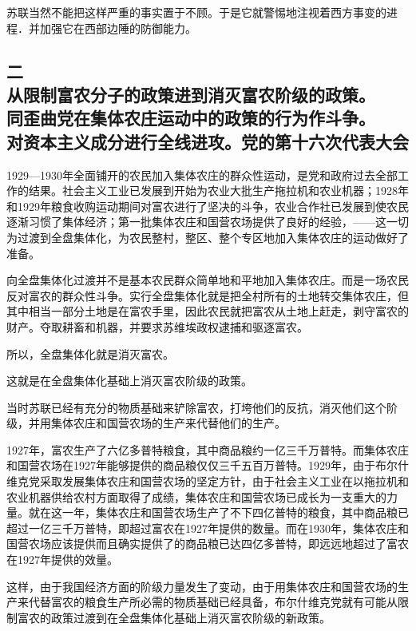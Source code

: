 苏联当然不能把这样严重的事实置于不顾。于是它就警惕地注视着西方事变的进程．并加强它在西部边陲的防御能力。


\subsection[二\q 从限制富农分子的政策进到消灭富农阶级的政策。同歪曲党在集体农庄运动中的政策的行为作斗争。对资本主义成分进行全线进攻。党的第十六次代表大会]{二\\从限制富农分子的政策进到消灭富农阶级的政策。\\同歪曲党在集体农庄运动中的政策的行为作斗争。\\对资本主义成分进行全线进攻。党的第十六次代表大会}

1929—1930年全面铺开的农民加入集体农庄的群众性运动，是党和政府过去全部工作的结果。社会主义工业已发展到开始为农业大批生产拖拉机和农业机器；1928年和1929年粮食收购运动期间对富农进行了坚决的斗争，农业合作社已发展到使农民逐渐习惯了集体经济；第一批集体农庄和国营农场提供了良好的经验，——这一切为过渡到全盘集体化，为农民整村，整区、整个专区地加入集体农庄的运动做好了准备。

向全盘集体化过渡并不是基本农民群众简单地和平地加入集体农庄。而是一场农民反对富农的群众性斗争。实行全盘集体化就是把全村所有的土地转交集体农庄，但其中相当一部分土地是在富农手里，因此农民就把富农从土地上赶走，剥守富农的财产。夺取耕畜和机器，并要求苏维埃政权逮捕和驱逐富农。

所以，全盘集体化就是消灭富农。

这就是在全盘集体化基础上消灭富农阶级的政策。

当时苏联已经有充分的物质基础来铲除富农，打垮他们的反抗，消灭他们这个阶级，并用集体农庄和国营农场的生产来代替他们的生产。

1927年，富农生产了六亿多普特粮食，其中商品粮约一亿三千万普特。而集体农庄和国营农场在1927年能够提供的商品粮仅仅三千五百万普特。1929年，由于布尔什维克党采取发展集体农庄和国营农场的坚定方针，由于社会主义工业在以拖拉机和农业机器供给农村方面取得了成绩，集体农庄和国营农场已成长为一支重大的力量。就在这一年，集体农庄和国营农场生产了不下四亿普特的粮食，其中商品粮已超过一亿三千万普特，即超过富农在1927年提供的数量。而在1930年，集体农庄和国营农场应该提供而且确实提供了的商品粮已达四亿多普特，即远远地超过了富农在1927年提供的效量。

这样，由于我国经济方面的阶级力量发生了变动，由于用集体农庄和国营农场的生产来代替富农的粮食生产所必需的物质基础已经具备，布尔什维克党就有可能从限制富农的政策过渡到在全盘集体化基础上消灭富农阶级的新政策。


